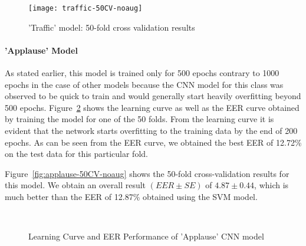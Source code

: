 \begin{figure}[!hb] 
\centering 
\texttt{[image: traffic-50CV-noaug]} 
\caption['Traffic' model: 50-fold cross validation results]{'Traffic' model: 50-fold cross validation results}
\label{fig:traffic-50CV-noaug} 
\end{figure}

\paragraph{'Applause' Model}
As stated earlier, this model is trained only for 500 epochs contrary to 1000 epochs in the case of other models because the CNN model for this class was observed to be quick to train and would generally start heavily overfitting beyond 500 epochs. Figure~\ref{fig:applause_1d_cnn_results} shows the learning curve as well as the EER curve obtained by training the model for one of the 50 folds. From the learning curve it is evident that the network starts overfitting to the training data by the end of 200 epochs. As can be seen from the EER curve, we obtained the best EER of 12.72\% on the test data for this particular fold.

Figure~\ref{fig:applause-50CV-noaug} shows the 50-fold cross-validation results for this model. We obtain an overall result $(EER \pm SE)$ of $4.87 \pm 0.44$, which is much better than the EER of 12.87\% obtained using the SVM model.


\begin{figure}[tb]
\centering
{} \quad
{} \\
\caption[Learning Curve and EER Performance of 'Applause' CNN model]{Learning Curve and EER Performance of 'Applause' CNN model}
\label{fig:applause_1d_cnn_results}
\end{figure}


